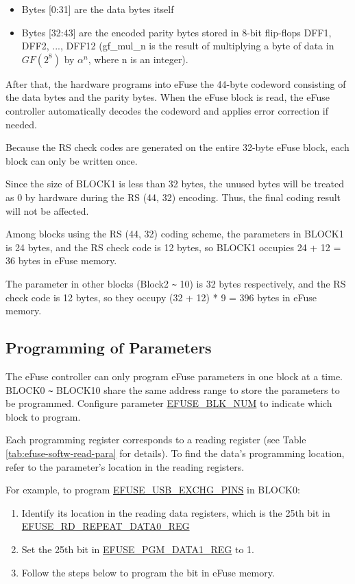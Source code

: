 \documentclass[main\_\_EN.tex]{subfiles}
\begin{document}
\begin{itemize}
    \item Bytes [0:31] are the data bytes itself
    \item Bytes [32:43] are the encoded parity bytes stored in 8-bit flip-flops DFF1, DFF2, ..., DFF12 (gf\_mul\_n is the result of multiplying a byte of data in \(GF(2^8)\) by \(\alpha^n\), where n is an integer).
\end{itemize}

After that, the hardware programs into eFuse the 44-byte codeword consisting of the data bytes and the parity bytes. When the eFuse block is read, the eFuse controller automatically decodes the codeword and applies error correction if needed.

Because the RS check codes are generated on the entire 32-byte eFuse block, each block can only be written once.

Since the size of BLOCK1 is less than 32 bytes, the unused bytes will be treated as 0 by hardware during the RS (44, 32) encoding. Thus, the final coding result will not be affected.

Among blocks using the RS (44, 32) coding scheme, the parameters in BLOCK1 is 24 bytes, and the RS check code is 12 bytes, so BLOCK1 occupies 24 + 12 = 36 bytes in eFuse memory.

The parameter in other blocks (Block2 \verb+~+ 10) is 32 bytes respectively, and the RS check code is 12 bytes, so they occupy (32 + 12) * 9 = 396 bytes in eFuse memory.

\subsection{Programming of Parameters}
\label{sec:efuse-software-programming-para}

The eFuse controller can only program eFuse parameters in one block at a time. BLOCK0 \verb+~+ BLOCK10 share the same address range to store the parameters to be programmed. Configure parameter \hyperref[fielddesc:EFUSEBLKNUM]{EFUSE\_BLK\_NUM} to indicate which block to program.


Each programming register corresponds to a reading register (see Table \ref{tab:efuse-softw-read-para} for details). To find the data's programming location, refer to the parameter's location in the reading registers.


For example, to program \hyperref[fielddesc:EFUSEUSBEXCHGPINS]{EFUSE\_USB\_EXCHG\_PINS} in BLOCK0:
\begin{enumerate}
    \item Identify its location in the reading data registers, which is the 25th bit in \hyperref[regdesc:EFUSERDREPEATDATA0REG]{EFUSE\_RD\_REPEAT\_DATA0\_REG}
    \item Set the 25th bit in \hyperref[regdesc:EFUSEPGMDATANREG]{EFUSE\_PGM\_DATA1\_REG} to 1.
    \item Follow the steps below to program the bit in eFuse memory.
\end{enumerate}
\end{document}
